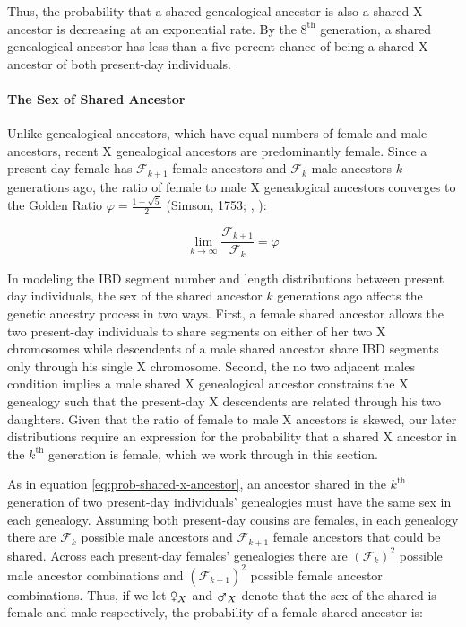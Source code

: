 \documentclass[11pt]{article}
\newcommand{\msxa}{\mars_X}
\newcommand{\fsxa}{\venus_X}
\begin{document}
Thus, the probability that a shared genealogical ancestor is also a shared X
ancestor is decreasing at an exponential rate. By the $8^\text{th}$ generation,
a shared genealogical ancestor has less than a five percent chance of being a
shared X ancestor of both present-day individuals.

\paragraph{The Sex of Shared Ancestor}
\label{p:sex-of-shared-ancestor}

Unlike genealogical ancestors, which have equal numbers of female and male
ancestors, recent X genealogical ancestors are predominantly female. Since a
present-day female has $\mathcal{F}_{k+1}$ female ancestors and
$\mathcal{F}_{k}$ male ancestors $k$ generations ago, the ratio of female to
male X genealogical ancestors converges to the Golden Ratio $\varphi = \frac{1
+ \sqrt{5}}{2}$ (Simson, 1753; \citeauthor{wells1997penguin},
\citeyear{wells1997penguin}):

\begin{equation}
  \lim_{k \to \infty} \frac{\mathcal{F}_{k+1}}{\mathcal{F}_k} = \varphi
\end{equation}

In modeling the IBD segment number and length distributions between present day
individuals, the sex of the shared ancestor $k$ generations ago affects the
genetic ancestry process in two ways. First, a female shared ancestor allows
the two present-day individuals to share segments on either of her two X
chromosomes while descendents of a male shared ancestor share IBD segments only
through his single X chromosome. Second, the no two adjacent males condition
implies a male shared X genealogical ancestor constrains the X genealogy such
that the present-day X descendents are related through his two daughters.
Given that the ratio of female to male X ancestors is skewed, our later
distributions require an expression for the probability that a shared X
ancestor in the $k^\text{th}$ generation is female, which we work through in
this section.

As in equation \eqref{eq:prob-shared-x-ancestor}, an ancestor shared in the
$k^\text{th}$ generation of two present-day individuals' genealogies must have
the same sex in each genealogy. Assuming both present-day cousins are females,
in each genealogy there are $\mathcal{F}_k$ possible male ancestors and
$\mathcal{F}_{k+1}$ female ancestors that could be shared. Across each
present-day females' genealogies there are $(\mathcal{F}_k)^2$ possible male
ancestor combinations and $(\mathcal{F}_{k+1})^2$ possible female ancestor
combinations. Thus, if we let $\fsxa$ and $\msxa$ denote that the sex of the
shared is female and male respectively, the probability of a female shared
ancestor is: 
\end{document}
